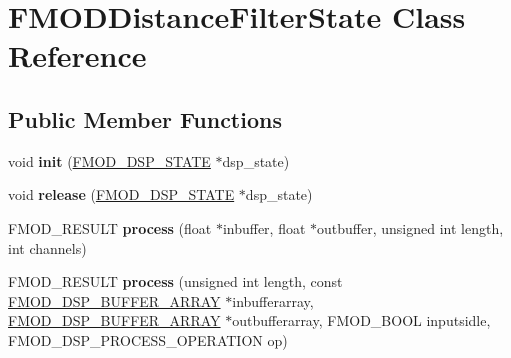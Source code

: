 \hypertarget{class_f_m_o_d_distance_filter_state}{\section{F\+M\+O\+D\+Distance\+Filter\+State Class Reference}
\label{class_f_m_o_d_distance_filter_state}
}
\subsection*{Public Member Functions}
\begin{DoxyCompactItemize}
\item 
\hypertarget{class_f_m_o_d_distance_filter_state_a0a56dad970e746050f309b3c85acc765}{void {\bfseries init} (\hyperlink{struct_f_m_o_d___d_s_p___s_t_a_t_e}{F\+M\+O\+D\+\_\+\+D\+S\+P\+\_\+\+S\+T\+A\+T\+E} $\ast$dsp\+\_\+state)}\label{class_f_m_o_d_distance_filter_state_a0a56dad970e746050f309b3c85acc765}

\item 
\hypertarget{class_f_m_o_d_distance_filter_state_aed67207c94bbdfc4cb4f12a29f8262b6}{void {\bfseries release} (\hyperlink{struct_f_m_o_d___d_s_p___s_t_a_t_e}{F\+M\+O\+D\+\_\+\+D\+S\+P\+\_\+\+S\+T\+A\+T\+E} $\ast$dsp\+\_\+state)}\label{class_f_m_o_d_distance_filter_state_aed67207c94bbdfc4cb4f12a29f8262b6}

\item 
\hypertarget{class_f_m_o_d_distance_filter_state_a3671cc21ae559f6b422553ffaced9df6}{F\+M\+O\+D\+\_\+\+R\+E\+S\+U\+L\+T {\bfseries process} (float $\ast$inbuffer, float $\ast$outbuffer, unsigned int length, int channels)}\label{class_f_m_o_d_distance_filter_state_a3671cc21ae559f6b422553ffaced9df6}

\item 
\hypertarget{class_f_m_o_d_distance_filter_state_a03823ae50036742968747452fcb5a647}{F\+M\+O\+D\+\_\+\+R\+E\+S\+U\+L\+T {\bfseries process} (unsigned int length, const \hyperlink{struct_f_m_o_d___d_s_p___b_u_f_f_e_r___a_r_r_a_y}{F\+M\+O\+D\+\_\+\+D\+S\+P\+\_\+\+B\+U\+F\+F\+E\+R\+\_\+\+A\+R\+R\+A\+Y} $\ast$inbufferarray, \hyperlink{struct_f_m_o_d___d_s_p___b_u_f_f_e_r___a_r_r_a_y}{F\+M\+O\+D\+\_\+\+D\+S\+P\+\_\+\+B\+U\+F\+F\+E\+R\+\_\+\+A\+R\+R\+A\+Y} $\ast$outbufferarray, F\+M\+O\+D\+\_\+\+B\+O\+O\+L inputsidle, F\+M\+O\+D\+\_\+\+D\+S\+P\+\_\+\+P\+R\+O\+C\+E\+S\+S\+\_\+\+O\+P\+E\+R\+A\+T\+I\+O\+N op)}\label{class_f_m_o_d_distance_filter_state_a03823ae50036742968747452fcb5a647}


\end{DoxyCompactItemize}
